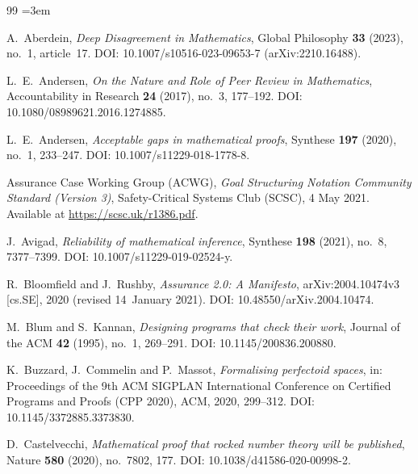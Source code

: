 \documentclass[11pt,a4paper]{article}
\begin{document}


\begin{thebibliography}{99}
\sloppy
\emergencystretch=3em


A.~Aberdein,
\emph{Deep Disagreement in Mathematics},
Global Philosophy \textbf{33} (2023), no.~1, article~17.
DOI: 10.1007/s10516-023-09653-7 (arXiv:2210.16488).

L.~E.~Andersen,
\emph{On the Nature and Role of Peer Review in Mathematics},
Accountability in Research \textbf{24} (2017), no.~3, 177--192.
DOI: 10.1080/08989621.2016.1274885.

L.~E.~Andersen,
\emph{Acceptable gaps in mathematical proofs},
Synthese \textbf{197} (2020), no.~1, 233--247.
DOI: 10.1007/s11229-018-1778-8.

Assurance Case Working Group (ACWG),
\emph{Goal Structuring Notation Community Standard (Version 3)},
Safety-Critical Systems Club (SCSC), 4 May 2021.
Available at \url{https://scsc.uk/r1386.pdf}.

J.~Avigad,
\emph{Reliability of mathematical inference},
Synthese \textbf{198} (2021), no.~8, 7377--7399.
DOI: 10.1007/s11229-019-02524-y.

R.~Bloomfield and J.~Rushby, \emph{Assurance 2.0: A Manifesto},
arXiv:2004.10474v3 [cs.SE], 2020 (revised 14~January 2021).
DOI: 10.48550/arXiv.2004.10474.

M.~Blum and S.~Kannan,
\emph{Designing programs that check their work},
Journal of the ACM \textbf{42} (1995), no.~1, 269--291.
DOI: 10.1145/200836.200880.

K.~Buzzard, J.~Commelin and P.~Massot,
\emph{Formalising perfectoid spaces},
in: Proceedings of the 9th ACM SIGPLAN International Conference on
Certified Programs and Proofs (CPP 2020), ACM, 2020, 299--312.
DOI: 10.1145/3372885.3373830.

D.~Castelvecchi,
\emph{Mathematical proof that rocked number theory will be published},
Nature \textbf{580} (2020), no.~7802, 177.
DOI: 10.1038/d41586-020-00998-2.


\end{thebibliography}
\end{document}
